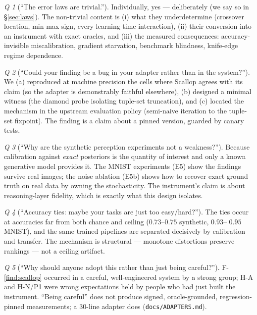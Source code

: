 \documentclass[10pt]{article}
\theoremstyle{remark}
\newtheorem{question}{Q}
\begin{document}
\begin{question}[``The error laws are trivial.'']
Individually, yes --- deliberately (we say so in \S\ref{sec:laws}). The non-trivial content is
(i) what they underdetermine (crossover location, min-max sign, every learning-time interaction),
(ii) their conversion into an instrument with exact oracles, and (iii) the measured consequences:
accuracy-invisible miscalibration, gradient starvation, benchmark blindness, knife-edge regime
dependence.
\end{question}

\begin{question}[``Could your finding be a bug in your adapter rather than in the system?'']
We (a) reproduced at machine precision the cells where Scallop agrees with its claim (so the
adapter is demonstrably faithful elsewhere), (b) designed a minimal witness (the diamond probe
isolating tuple-set truncation), and (c) located the mechanism in the upstream evaluation
policy (semi-naive iteration to the tuple-set fixpoint). The finding is a claim about a pinned
version, guarded by canary tests.
\end{question}

\begin{question}[``Why are the synthetic perception experiments not a weakness?'']
Because calibration against \emph{exact} posteriors is the quantity of interest and only a known
generative model provides it. The MNIST experiments (E5) show the findings survive real images;
the noise ablation (E5b) shows how to recover exact ground truth on real data by owning the
stochasticity. The instrument's claim is about reasoning-layer fidelity, which is exactly what
this design isolates.
\end{question}

\begin{question}[``Accuracy ties: maybe your tasks are just too easy/hard?'']
The ties occur at accuracies far from both chance and ceiling ($0.73$--$0.75$ synthetic, $0.93$--%
$0.95$ MNIST), and the same trained pipelines are separated decisively by calibration and
transfer. The mechanism is structural --- monotone distortions preserve rankings --- not a
ceiling artifact.
\end{question}

\begin{question}[``Why should anyone adopt this rather than just being careful?'']
F-\ref{find:scallop} occurred in a careful, well-engineered system by a strong group; H-A and H-N/P1 were wrong expectations held by people who had just built the
instrument. ``Being careful'' does not produce signed, oracle-grounded, regression-pinned
measurements; a 30-line adapter does (\texttt{docs/ADAPTERS.md}).
\end{question}
\end{document}

